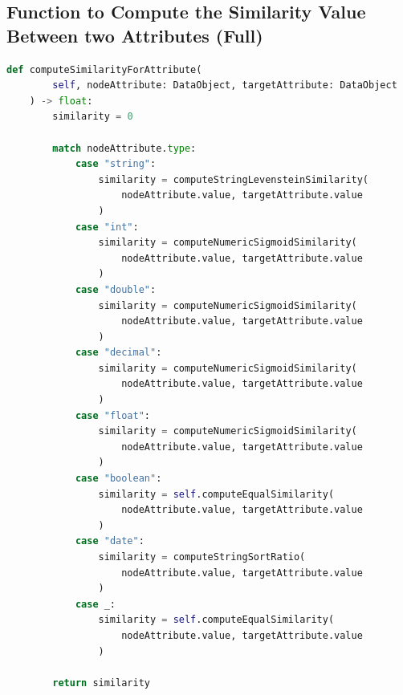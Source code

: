 \subsection{Function to Compute the Similarity Value Between two Attributes (Full)\label{annex:comp-sim-att-full}}
\begin{lstlisting}[language=Python, caption=Function to Compute the Similarity Value Between Two Attributes, label={lst:comp-sim-att}]
def computeSimilarityForAttribute(
        self, nodeAttribute: DataObject, targetAttribute: DataObject
    ) -> float:
        similarity = 0

        match nodeAttribute.type:
            case "string":
                similarity = computeStringLevensteinSimilarity(
                    nodeAttribute.value, targetAttribute.value
                )
            case "int":
                similarity = computeNumericSigmoidSimilarity(
                    nodeAttribute.value, targetAttribute.value
                )
            case "double":
                similarity = computeNumericSigmoidSimilarity(
                    nodeAttribute.value, targetAttribute.value
                )
            case "decimal":
                similarity = computeNumericSigmoidSimilarity(
                    nodeAttribute.value, targetAttribute.value
                )
            case "float":
                similarity = computeNumericSigmoidSimilarity(
                    nodeAttribute.value, targetAttribute.value
                )
            case "boolean":
                similarity = self.computeEqualSimilarity(
                    nodeAttribute.value, targetAttribute.value
                )
            case "date":
                similarity = computeStringSortRatio(
                    nodeAttribute.value, targetAttribute.value
                )
            case _:
                similarity = self.computeEqualSimilarity(
                    nodeAttribute.value, targetAttribute.value
                )

        return similarity
\end{lstlisting}